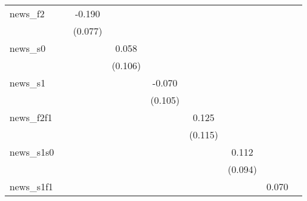 {\begin{tabular}{l*{8}{c}}
news\_f2     &                     &      -0.190\sym{**} &                     &                     &                     &                     &                     &                     \\
            &                     &     (0.077)         &                     &                     &                     &                     &                     &                     \\
\addlinespace
news\_s0     &                     &                     &       0.058         &                     &                     &                     &                     &                     \\
            &                     &                     &     (0.106)         &                     &                     &                     &                     &                     \\
\addlinespace
news\_s1     &                     &                     &                     &      -0.070         &                     &                     &                     &                     \\
            &                     &                     &                     &     (0.105)         &                     &                     &                     &                     \\
\addlinespace
news\_f2f1   &                     &                     &                     &                     &       0.125         &                     &                     &                     \\
            &                     &                     &                     &                     &     (0.115)         &                     &                     &                     \\
\addlinespace
news\_s1s0   &                     &                     &                     &                     &                     &       0.112         &                     &                     \\
            &                     &                     &                     &                     &                     &     (0.094)         &                     &                     \\
\addlinespace
news\_s1f1   &                     &                     &                     &                     &                     &                     &       0.070         &                     \\

\end{tabular}}

